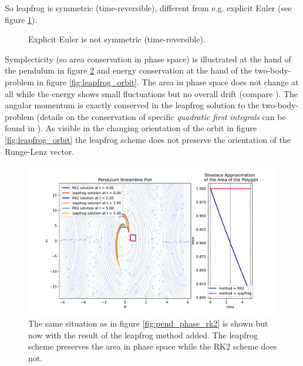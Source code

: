 So leapfrog is symmetric (time-reversible), different from e.g. explicit Euler (see figure \ref{fig:euler_symm}).

\begin{figure}[!htb]
  \centering
  \hfill
  \caption{Explicit Euler is not symmetric (time-reversible).}
  \label{fig:euler_symm}
\end{figure}



Symplecticity (so area conservation in phase space) is illustrated at the hand of the pendulum in figure \ref{fig:pend_phase_lf} and energy conservation at the hand of the two-body-problem in figure \ref{fig:leapfrog_orbit}. The area in phase space does not change at all while the energy shows small fluctuations but no overall drift (compare \cite[theorem 5.5]{hairer03}). The angular momentum is exactly conserved in the leapfrog solution to the two-body-problem (details on the conservation of specific \textit{quadratic first integrals} can be found in \cite[theorem 3.5]{hairer03}). As visible in the changing orientation of the orbit in figure \ref{fig:leapfrog_orbit} the leapfrog scheme does not preserve the orientation of the Runge-Lenz vector.

\begin{figure}[!htb]
  \centering
  \includegraphics[width=1\textwidth]{figures/phase_spaceA.pdf}\hfill
  \caption{The same situation as in figure \ref{fig:pend_phase_rk2} is shown but now with the result of the leapfrog method added. The leapfrog scheme preserves the area in phase space while the RK2 scheme does not.}
  \label{fig:pend_phase_lf}
\end{figure}

